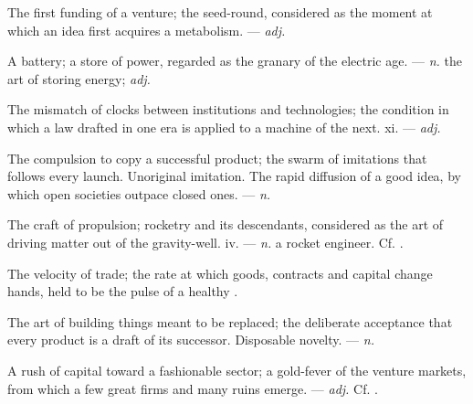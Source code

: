  The first funding of a venture; the seed-round, considered as the moment at which an idea first acquires a metabolism.   ---  \textit{adj.}

 A battery; a store of power, regarded as the granary of the electric age.  ---  \textit{n.} the art of storing energy;  \textit{adj.}

 The mismatch of clocks between institutions and technologies; the condition in which a law drafted in one era is applied to a machine of the next.   xi. ---  \textit{adj.}

 The compulsion to copy a successful product; the swarm of imitations that follows every launch.   Unoriginal imitation.   The rapid diffusion of a good idea, by which open societies outpace closed ones. ---  \textit{n.}

 The craft of propulsion; rocketry and its descendants, considered as the art of driving matter out of the gravity-well.   iv. ---  \textit{n.} a rocket engineer. Cf. .

 The velocity of trade; the rate at which goods, contracts and capital change hands, held to be the pulse of a healthy .

  The art of building things meant to be replaced; the deliberate acceptance that every product is a draft of its successor.   Disposable novelty.  ---  \textit{n.}

 A rush of capital toward a fashionable sector; a gold-fever of the venture markets, from which a few great firms and many ruins emerge.   ---  \textit{adj.} Cf. .

